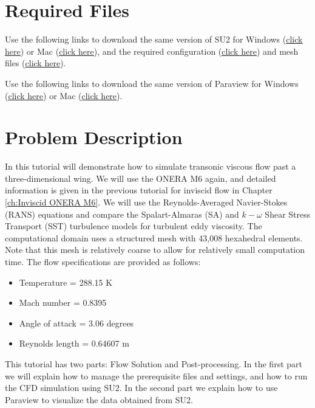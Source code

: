 \section{Required Files}
\begin{su2note}
	Use the following links to download the same version of SU2 for Windows (\href{https://users.encs.concordia.ca/~bvermeir/book/executables/windows/SU2-v7.0.0-win64.zip}{\underline{click here}}) or Mac (\href{https://users.encs.concordia.ca/~bvermeir/book/executables/osx/SU2-v7.0.0-macos64.zip}{\underline{click here}}), and the required configuration (\href{https://gitlab.com/bvermeir/book-cfd/blob/master/tutorial/tut5_turbulent_oneram6/turb_ONERAM6.cfg}{\underline{click here}}) and mesh files (\href{https://gitlab.com/bvermeir/book-cfd/blob/master/tutorial/tut5_turbulent_oneram6/mesh_ONERAM6_turb_hexa_43008.su2}{\underline{click here}}).
\end{su2note}
\begin{paraviewnote}
	Use the following links to download the same version of Paraview for Windows (\href{https://users.encs.concordia.ca/~bvermeir/book/executables/windows/ParaView-5.4.0-Qt5-OpenGL2-Windows-64bit.exe}{\underline{click here}}) or Mac (\href{https://users.encs.concordia.ca/~bvermeir/book/executables/osx/ParaView-5.4.0-Qt5-OpenGL2-MPI-OSX10.8-64bit.dmg}{\underline{click here}}).
\end{paraviewnote}

\section{Problem Description}
In this tutorial will demonstrate how to simulate transonic viscous flow past a three-dimensional wing. We will use the ONERA M6 again, and detailed information is given in the previous tutorial for inviscid flow in Chapter \ref{ch:Inviscid ONERA M6}. We will use the Reynolds-Averaged Navier-Stokes (RANS) equations and compare the Spalart-Almaras (SA) and $k-\omega$ Shear Stress Transport (SST) turbulence models for turbulent eddy viscosity. The computational domain uses a structured mesh with 43,008 hexahedral elements. Note that this mesh is relatively coarse to allow for relatively small computation time. The flow specifications are provided as follows:
\begin{itemize}
    \item Temperature = 288.15 K
    \item Mach number = 0.8395
    \item Angle of attack = 3.06 degrees
    \item Reynolds length = 0.64607 m
\end{itemize}
This tutorial has two parts: Flow Solution and Post-processing. In the first part we will explain how to manage the prerequisite files and settings, and how to run the CFD simulation using SU2. In the second part we explain how to use Paraview to visualize the data obtained from SU2.
